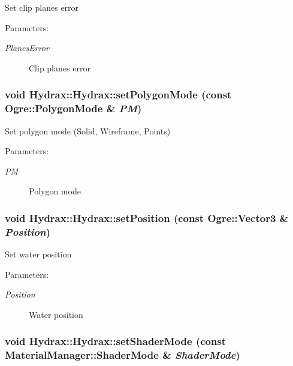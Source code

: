 Set clip planes error \begin{Desc}
\item[Parameters:]
\begin{description}
\item[{\em PlanesError}]Clip planes error \end{description}
\end{Desc}
\hypertarget{class_hydrax_1_1_hydrax_9110c2569465617ca22f32fc67da096d}{
\subsubsection[{setPolygonMode}]{\setlength{\rightskip}{0pt plus 5cm}void Hydrax::Hydrax::setPolygonMode (const Ogre::PolygonMode \& {\em PM})}}
\label{class_hydrax_1_1_hydrax_9110c2569465617ca22f32fc67da096d}


Set polygon mode (Solid, Wireframe, Points) \begin{Desc}
\item[Parameters:]
\begin{description}
\item[{\em PM}]Polygon mode \end{description}
\end{Desc}
\hypertarget{class_hydrax_1_1_hydrax_26f48dec7e37c8f352570192ef38fb90}{
\subsubsection[{setPosition}]{\setlength{\rightskip}{0pt plus 5cm}void Hydrax::Hydrax::setPosition (const Ogre::Vector3 \& {\em Position})}}
\label{class_hydrax_1_1_hydrax_26f48dec7e37c8f352570192ef38fb90}


Set water position \begin{Desc}
\item[Parameters:]
\begin{description}
\item[{\em Position}]Water position \end{description}
\end{Desc}
\hypertarget{class_hydrax_1_1_hydrax_187619a5f2ea2e1fe65ac3cd35103203}{
\subsubsection[{setShaderMode}]{\setlength{\rightskip}{0pt plus 5cm}void Hydrax::Hydrax::setShaderMode (const {\bf MaterialManager::ShaderMode} \& {\em ShaderMode})}}
\label{class_hydrax_1_1_hydrax_187619a5f2ea2e1fe65ac3cd35103203}



